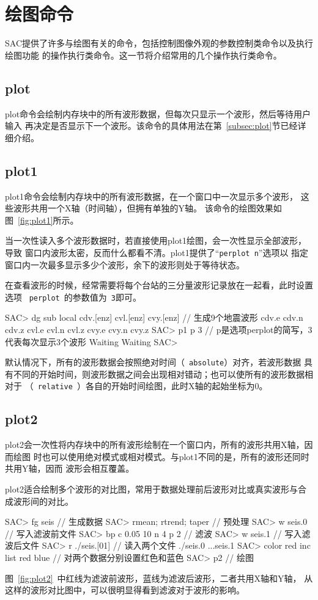 \section{绘图命令}
SAC提供了许多与绘图有关的命令，包括控制图像外观的参数控制类命令以及执行绘图功能
的操作执行类命令。这一节将介绍常用的几个操作执行类命令。

\subsection{plot}
plot命令会绘制内存块中的所有波形数据，但每次只显示一个波形，然后等待用户输入
再决定是否显示下一个波形。该命令的具体用法在第~\ref{subsec:plot}节已经详细介绍。

\subsection{plot1}
plot1命令会绘制内存块中的所有波形数据，在一个窗口中一次显示多个波形，
这些波形共用一个X轴（时间轴），但拥有单独的Y轴。
该命令的绘图效果如图~\ref{fig:plot1}所示。

当一次性读入多个波形数据时，若直接使用plot1绘图，会一次性显示全部波形，导致
窗口内波形太密，反而什么都看不清。plot1提供了``\verb+perplot n+''选项以
指定窗口内一次最多显示多少个波形，余下的波形则处于等待状态。

在查看波形的时候，经常需要将每个台站的三分量波形记录放在一起看，此时设置选项
~\verb+perplot+~的参数值为~\verb+3+即可。
\begin{SACCode}
SAC> dg sub local cdv.[enz] cvl.[enz] cvy.[enz]  // 生成9个地震波形
cdv.e cdv.n cdv.z cvl.e cvl.n cvl.z cvy.e cvy.n cvy.z
SAC> p1 p 3         // p是选项perplot的简写，3代表每次显示3个波形
Waiting
Waiting
SAC> 
\end{SACCode}

默认情况下，所有的波形数据会按照绝对时间（~\verb+absolute+）对齐，若波形数据
具有不同的开始时间，则波形数据之间会出现相对错动；也可以使所有的波形数据相对于
（~\verb+relative+~）各自的开始时间绘图，此时X轴的起始坐标为0。

\subsection{plot2}
plot2会一次性将内存块中的所有波形绘制在一个窗口内，所有的波形共用X轴，因而绘图
时也可以使用绝对模式或相对模式。与plot1不同的是，所有的波形还同时共用Y轴，因而
波形会相互覆盖。

plot2适合绘制多个波形的对比图，常用于数据处理前后波形对比或真实波形与合成波形间的对比。
\begin{SACCode}
SAC> fg seis                     // 生成数据
SAC> rmean; rtrend; taper        // 预处理
SAC> w seis.0                    // 写入滤波前文件
SAC> bp c 0.05 10 n 4 p 2        // 滤波
SAC> w seis.1                    // 写入滤波后文件
SAC> r ./seis.[01]               // 读入两个文件
./seis.0 ...seis.1
SAC> color red inc list red blue // 对两个数据分别设置红色和蓝色
SAC> p2                          // 绘图
\end{SACCode}
图~\ref{fig:plot2}~中红线为滤波前波形，蓝线为滤波后波形，二者共用X轴和Y轴，
从这样的波形对比图中，可以很明显得看到滤波对于波形的影响。

